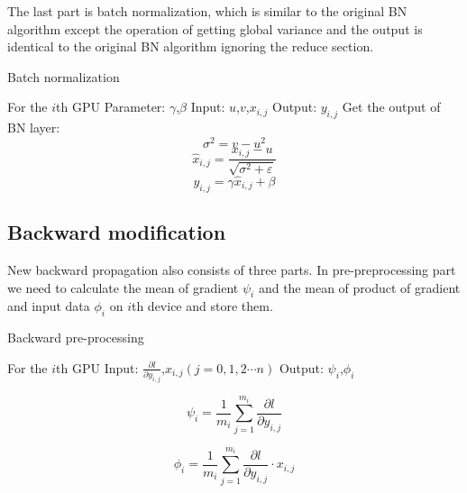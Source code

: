 The last part is batch normalization, which is similar to the original BN algorithm except the operation of getting global variance and the output is identical to the original BN algorithm ignoring the reduce section.

\begin{algorithm}[h]
\caption{Batch normalization} %
\label{alg:forward-norm}
\begin{algorithmic}[1]
\State For the $i $th GPU
\State Parameter: $\gamma$,$\beta$
\State Input: $u$,$v$,$x_{i,j}$
\State Output: $y_{i,j}$
\State Get the output of BN layer:
\begin{equation}
    {\sigma ^2} = v - {u^2}
\end{equation}
\begin{equation}
    {\hat x_{i,j}} = \frac{{{x_{i,j}} - u}}{{\sqrt {{\sigma ^2} + \varepsilon } }}
\end{equation}
\begin{equation}
    {y_{i,j}} = \gamma {\hat x_{i,j}} + \beta 
\end{equation}
\end{algorithmic}
\end{algorithm}



\subsection{Backward modification}

New backward propagation also consists of three parts. In pre-preprocessing part we need to calculate the mean of gradient $\psi_{i}$ and the mean of product of gradient and input data $\phi_{i}$ on $i$th device and store them.

\begin{algorithm}
    \caption{Backward pre-processing}
    \label{alg:backward-pre}
    \begin{algorithmic}[1]
        \State For the $i$th GPU
        \State Input: $\frac{\partial l}{\partial y_{i,j}}$,$x_{i,j}$$(j = 0,1,2\cdots n)$
        \State Output: $\psi_{i}$,$\phi_{i}$

        \begin{equation}
            {\psi_{i}} = {\frac{1}{m_{i}}} {\sum_{j=1}^{m_{i}} {\frac{\partial l}{\partial y_{i,j}}}}
        \end{equation}

        \begin{equation}
            {\phi_{i}} = {\frac{1}{m_{i}}} {\sum_{j=1}^{m_{i}} {\frac{\partial l}{\partial y_{i,j}}} \cdot {x_{i,j}}}
        \end{equation}
    \end{algorithmic}
\end{algorithm}


